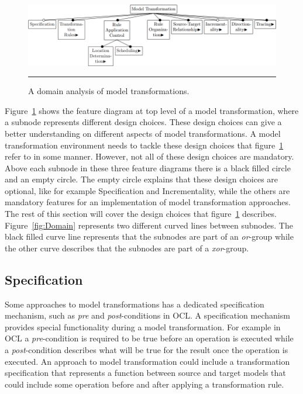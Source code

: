 \begin{figure}[H]
  \centering
    \includegraphics[scale=0.65]{./Figures/Model_Transformation_Survey_1.png}
    \rule{35em}{0.5pt}
  \caption[Domain Analysis of Model Transformations]
  				{A domain analysis of model transformations\cite{Czarnecki2006}.}
  \label{fig:Model_Transformation_Survey}
\end{figure}

Figure~\ref{fig:Model_Transformation_Survey} shows the feature diagram at top
level of a model transformation, where a subnode represents different design
choices. These design choices can give
a better understanding on different aspects of model transformations. A model
transformation environment needs to tackle these design choices that
figure~\ref{fig:Model_Transformation_Survey} refer to in some manner. However,
not all of these design choices are mandatory.
Above each subnode in these three feature diagrams there is a black filled
circle and an empty circle. The empty circle explains that these design choices
are optional, like for example Specification and Incrementality, while the
others are mandatory features for an implementation of model transformation
approaches. The rest of this section will cover the design choices that
figure~\ref{fig:Model_Transformation_Survey} describes. Figure~\ref{fig:Domain}
represents two different curved lines between subnodes. The black filled curve
line represents that the subnodes are part of an \textit{or}-group while the
other curve describes that the subnodes are part of a \textit{xor}-group.

\subsection{Specification}

Some approaches to model transformations has a dedicated specification
mechanism, such as \textit{pre} and \textit{post}-conditions in OCL. A
specification mechanism provides special functionality during a model transformation. For example in OCL
a \textit{pre}-condition is required to be true before an operation is executed
while a \textit{post}-condition describes what will be true for the result once the
operation is executed. An approach to model transformation could include a transformation
specification that represents a function between source and target models that 
could include some operation before and after applying a transformation rule.

